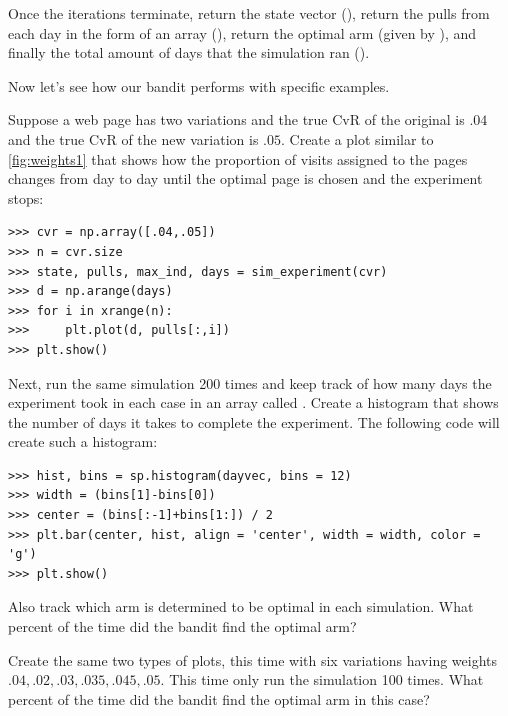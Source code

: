\begin{problem}
Once the iterations terminate, return the state vector (),
return the pulls from each day in the form of an array (),
return the optimal arm (given by ), and finally the total amount
of days that the simulation ran ().
\end{problem}

Now let's see how our bandit performs with specific examples.

\begin{problem}
Suppose a web page has two variations and the true CvR of the original is
$.04$ and the true CvR of the new variation is $.05$.
Create a plot similar to \ref{fig:weights1} that shows how the proportion of visits
assigned to the pages changes from day to day until the optimal page is chosen and the experiment
stops:
\begin{lstlisting}
>>> cvr = np.array([.04,.05])
>>> n = cvr.size
>>> state, pulls, max_ind, days = sim_experiment(cvr)
>>> d = np.arange(days)
>>> for i in xrange(n):
>>>     plt.plot(d, pulls[:,i])
>>> plt.show()
\end{lstlisting}

Next, run the same simulation 200 times and keep track of how many days
the experiment took in each case in an array called .
Create a histogram that shows the
number of days it takes to complete the experiment.
The following code will create such a histogram:
\begin{lstlisting}
>>> hist, bins = sp.histogram(dayvec, bins = 12)
>>> width = (bins[1]-bins[0])
>>> center = (bins[:-1]+bins[1:]) / 2
>>> plt.bar(center, hist, align = 'center', width = width, color = 'g')
>>> plt.show()
\end{lstlisting}
Also track which arm is determined to be optimal in each simulation.
What percent of the time did the bandit find the optimal arm?

Create the same two types of plots, this time with six variations having
weights $.04,.02,.03,.035,.045,.05$.  This time only run the simulation 100 times.
What percent of the time did the bandit find the optimal arm in this case?
\end{problem}

